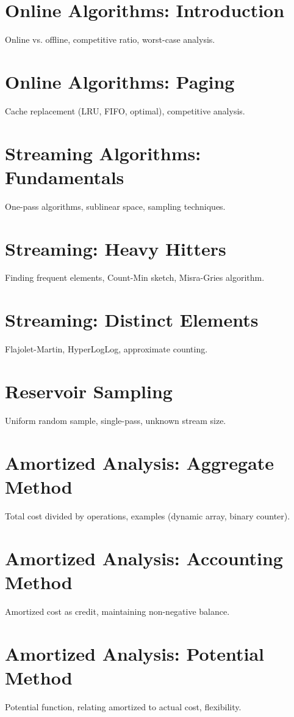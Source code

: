 
\chapter{Online Algorithms: Introduction}
Online vs. offline, competitive ratio, worst-case analysis.

\chapter{Online Algorithms: Paging}
Cache replacement (LRU, FIFO, optimal), competitive analysis.

\chapter{Streaming Algorithms: Fundamentals}
One-pass algorithms, sublinear space, sampling techniques.

\chapter{Streaming: Heavy Hitters}
Finding frequent elements, Count-Min sketch, Misra-Gries algorithm.

\chapter{Streaming: Distinct Elements}
Flajolet-Martin, HyperLogLog, approximate counting.

\chapter{Reservoir Sampling}
Uniform random sample, single-pass, unknown stream size.

\chapter{Amortized Analysis: Aggregate Method}
Total cost divided by operations, examples (dynamic array, binary counter).

\chapter{Amortized Analysis: Accounting Method}
Amortized cost as credit, maintaining non-negative balance.

\chapter{Amortized Analysis: Potential Method}
Potential function, relating amortized to actual cost, flexibility.

